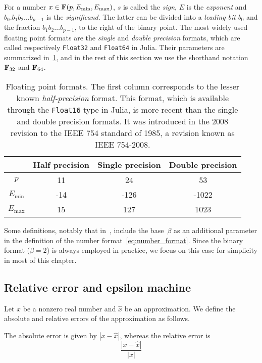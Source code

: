 For a number $x \in \mathbf F(p, E_{\min}, E_{\max})$,
$s$ is called the \emph{sign}, $E$ is the \emph{exponent} and
$b_0. b_1 b_2 \dots b_{p-1}$ is the \emph{significand}.
The latter can be divided into a \emph{leading bit} $b_0$ and the fraction $b_1 b_2 \dots b_{p-1}$,
to the right of the binary point.
The most widely used floating point formats are the \emph{single} and \emph{double precision} formats,
which are called respectively \texttt{Float32} and \texttt{Float64} in Julia.
Their parameters are summarized in~\cref{table:floating_point_formats},
and in the rest of this section we use the shorthand notation $\mathbf F_{32}$ and $\mathbf F_{64}$.
\begin{table}[ht]
    \centering
    \begin{tabular}{|c|c|c|c|}
        \hline
        & Half precision & Single precision & Double precision
        \\ \hline
        $p$ & 11 & 24 & 53
        \\ \hline
        $E_{\min}$ & -14 & -126 & -1022
        \\ \hline
        $E_{\max}$ & 15 & 127 & 1023
        \\ \hline
    \end{tabular}
    \caption{%
        Floating point formats.
        The first column corresponds to the lesser known \emph{half-precision} format.
        This format,
        which is available through the \texttt{Float16} type in Julia,
        is more recent than the single and double precision formats.
        It was introduced in the 2008 revision to the IEEE 754 standard of 1985,
        a revision known as IEEE 754-2008.
    }%
    \label{table:floating_point_formats}
\end{table}

\begin{remark}
    Some definitions,
    notably that in~\cite[Section 2.5.2]{MR2265914},
    include the base~$\beta$
    as an additional parameter in the definition of the number format~\eqref{eq:number_format}.
    Since the binary format ($\beta = 2$) is always employed in practice,
    we focus on this case for simplicity in most of this chapter.
\end{remark}

\subsection{Relative error and epsilon machine}%
\label{sub:relative_error_and_epsilon_machine}
Let $x$ be a nonzero real number and $\widehat x$ be an approximation.
We define the absolute and relative errors of the approximation as follows.
\begin{definition}
    The absolute error is given by $|x - \widehat x|$,
    whereas the relative error is
    \[
        \frac{|x - \widehat x|}{|x|}
    \]
\end{definition}

